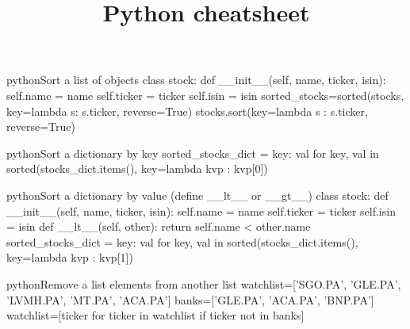 \documentclass[10pt,a4paper]{article}
\title{\color{w3schools}Python cheatsheet
}
\begin{document}
\maketitle
\small
\begin{multicols}{3}

\thispagestyle{empty}
\scriptsize

% 




\begin{codebox}{python}{Sort a list of objects}
class stock:
    def __init__(self, name, ticker, isin):
self.name = name
self.ticker = ticker
self.isin = isin
sorted_stocks=sorted(stocks, key=lambda s: s.ticker, reverse=True)
stocks.sort(key=lambda s : s.ticker, reverse=True)

\end{codebox}

\begin{codebox}{python}{Sort a dictionary by key}
sorted_stocks_dict = {key: val for key, val     
    in sorted(stocks_dict.items(), key=lambda kvp : kvp[0])}

\end{codebox}

\begin{codebox}{python}{Sort a dictionary by value (define \_\_lt\_\_ or \_\_gt\_\_)}
class stock:
    def __init__(self, name, ticker, isin):
self.name = name
self.ticker = ticker
self.isin = isin
    def __lt__(self, other):
return self.name < other.name
sorted_stocks_dict = {key: val for key, val     
    in sorted(stocks_dict.items(), key=lambda kvp : kvp[1])}

\end{codebox}

\begin{codebox}{python}{Remove a list elements from another list}
watchlist=['SGO.PA', 'GLE.PA', 'LVMH.PA', 'MT.PA', 'ACA.PA']
banks=['GLE.PA', 'ACA.PA', 'BNP.PA']
watchlist=[ticker for ticker in watchlist if ticker not in banks]


\end{codebox}
\end{multicols}
\end{document}
